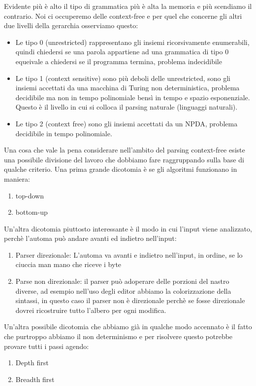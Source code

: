 Evidente più è alto il tipo di grammatica più è alta la memoria e più scendiamo il contrario.
Noi ci occuperemo delle context-free e per quel che concerne gli altri due livelli della gerarchia osserviamo questo:
\begin{itemize}
    \item Le tipo 0 (unrestricted) rappresentano gli insiemi ricorsivamente enumerabili, quindi chiedersi se una parola appartiene ad una grammatica di tipo 0 equeivale a chiedersi se il programma termina, problema indecidibile
    \item Le tipo 1 (context sensitive) sono più deboli delle unrestricted, sono gli insiemi accettati da una macchina di Turing non deterministica, problema decidibile ma non in tempo polinomiale bensì in tempo e spazio esponenziale. Questo è il livello in cui si colloca il parsing naturale (linguaggi naturali).
    \item Le tipo 2 (context free) sono gli insiemi accettati da un NPDA, problema decidibile in tempo polinomiale.
\end{itemize}

Una cosa che vale la pena considerare nell'ambito del parsing context-free esiste una possibile divisione del lavoro che dobbiamo fare raggruppando sulla base di qualche criterio. Una prima grande dicotomia è se gli algoritmi funzionano in maniera:
\begin{enumerate}
    \item top-down
    \item bottom-up
\end{enumerate}

Un'altra dicotomia piuttosto interessante è il modo in cui l'input viene analizzato, perchè l'automa può andare avanti ed indietro nell'input:
\begin{enumerate}
    \item Parser direzionale: L'automa va avanti e indietro nell'input, in ordine, se lo ciuccia man mano che riceve i byte
    \item Parse non direzionale: il parser può adoperare delle porzioni del nastro diverse, ad esempio nell'uso degli editor abbiamo la colorizzazione della sintassi, in questo caso il parser non è direzionale perchè se fosse direzionale dovrei ricostruire tutto l'albero per ogni modifica.
\end{enumerate}

Un'altra possibile dicotomia che abbiamo già in qualche modo accennato è il fatto che purtroppo abbiamo il non determinismo e per risolvere questo potrebbe provare tutti i passi agendo:
\begin{enumerate}
    \item Depth first
    \item Breadth first
\end{enumerate}

